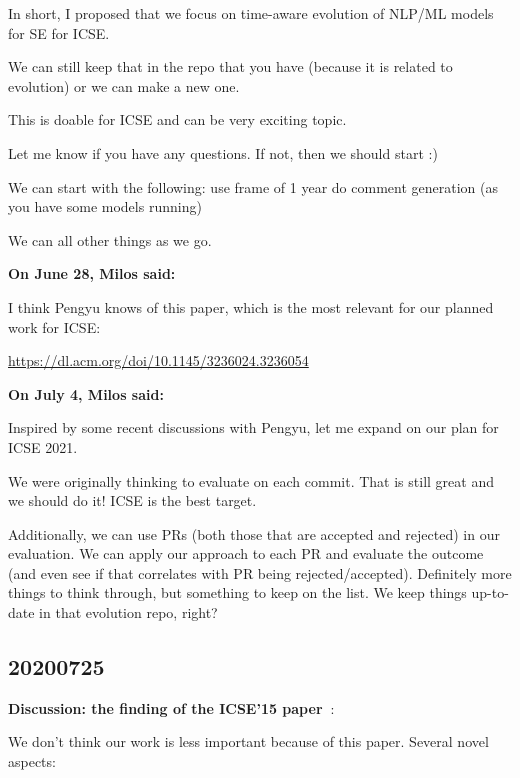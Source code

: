 In short, I proposed that we focus on time-aware evolution of NLP/ML
models for SE for ICSE.

We can still keep that in the repo that you have (because it is related
to evolution) or we can make a new one.

This is doable for ICSE and can be very exciting topic.

Let me know if you have any questions.  If not, then we should start :)

We can start with the following:
use frame of 1 year
do comment generation (as you have some models running)

We can all other things as we go.


\textbf{On June 28, Milos said:}

I think Pengyu knows of this paper, which is the most relevant for our
planned work for ICSE:

\url{https://dl.acm.org/doi/10.1145/3236024.3236054} \cite{TuETAL18Careful}


\textbf{On July 4, Milos said:}

Inspired by some recent discussions with Pengyu, let me expand on our
plan for ICSE 2021.

We were originally thinking to evaluate on each commit.  That is still
great and we should do it!  ICSE is the best target.

Additionally, we can use PRs (both those that are accepted and rejected)
in our evaluation.  We can apply our approach to each PR and evaluate
the outcome (and even see if that correlates with PR being
rejected/accepted).  Definitely more things to think through, but
something to keep on the list.  We keep things up-to-date in that
evolution repo, right?


\subsection{20200725}

\textbf{Discussion: the finding of the ICSE'15
  paper~\cite{TanETAL15Online}}:

We don't think our work is less important because of this paper.
Several novel aspects:

